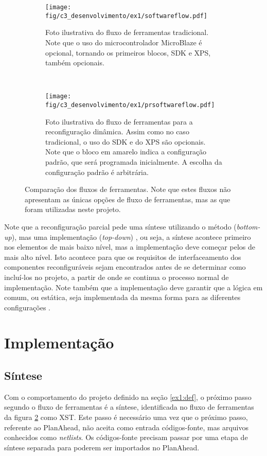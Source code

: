 \documentclass[11pt,a4paper,oneside]{book}
\begin{document}
\begin{figure}[h]
	\centering
       	\begin{subfigure}[b]{\textwidth}
       		\centering
		\texttt{[image: fig/c3\_desenvolvimento/ex1/softwareflow.pdf]}
		\caption{Foto ilustrativa do fluxo de ferramentas tradicional. Note que o uso do microcontrolador MicroBlaze é opcional, tornando os primeiros blocos, SDK e XPS, também opcionais.}
		\label{fig:ex1:softwareflow}
	\end{subfigure}\\
	\begin{subfigure}[b]{\textwidth}
		\centering
		\texttt{[image: fig/c3\_desenvolvimento/ex1/prsoftwareflow.pdf]}
		\caption{Foto ilustrativa do fluxo de ferramentas para a reconfiguração dinâmica. Assim como no caso tradicional, o uso do SDK e do XPS são opcionais. Note que o bloco em amarelo indica a configuração padrão, que será programada inicialmente. A escolha da configuração padrão é arbitrária.}
		\label{fig:ex1:prsoftwareflow}
	\end{subfigure}
	\caption{Comparação dos fluxos de ferramentas. Note que estes fluxos não apresentam as únicas opções de fluxo de ferramentas, mas as que foram utilizadas neste projeto.}
	\label{fig:ex1:softwareflow:comparacao}
\end{figure}

Note que a reconfiguração parcial pede uma síntese utilizando o método  (\textit{bottom-up}), mas uma implementação  (\textit{top-down}) \cite{ug743}, ou seja, a síntese acontece primeiro nos elementos de mais baixo nível, mas a implementação deve começar pelos de mais alto nível.
Isto acontece para que os requisitos de interfaceamento dos componentes reconfiguráveis sejam encontrados antes de se determinar como incluí-los no projeto, a partir de onde se continua o processo normal de implementação.
Note também que a implementação deve garantir que a lógica em comum, ou estática, seja implementada da mesma forma para as diferentes configurações \cite{ug702}.

\section{Implementação}
\subsection{Síntese}
Com o comportamento do projeto definido na seção \ref{ex1:def}, o próximo passo segundo o fluxo de ferramentas é a síntese, identificada no fluxo de ferramentas da figura \ref{fig:ex1:prsoftwareflow} como XST.
Este passo é necessário uma vez que o próximo passo, referente ao PlanAhead, não aceita como entrada códigos-fonte, mas arquivos conhecidos como \textit{netlists}.
Os códigos-fonte precisam passar por uma etapa de síntese separada para poderem ser importados no PlanAhead.
\end{document}
